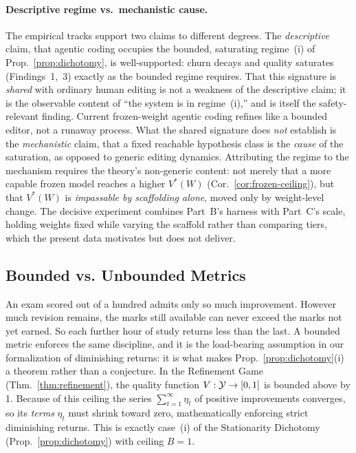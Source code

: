 \paragraph{Descriptive regime vs.\ mechanistic cause.} The empirical tracks support two claims to different degrees. The \emph{descriptive} claim, that agentic coding occupies the bounded, saturating regime~(i) of Prop.~\ref{prop:dichotomy}, is well-supported: churn decays and quality saturates (Findings~1,~3) exactly as the bounded regime requires. That this signature is \emph{shared} with ordinary human editing is not a weakness of the descriptive claim; it is the observable content of ``the system is in regime~(i),'' and is itself the safety-relevant finding. Current frozen-weight agentic coding refines like a bounded editor, not a runaway process. What the shared signature does \emph{not} establish is the \emph{mechanistic} claim, that a fixed reachable hypothesis class is the \emph{cause} of the saturation, as opposed to generic editing dynamics. Attributing the regime to the mechanism requires the theory's non-generic content: not merely that a more capable frozen model reaches a higher $V^*(W)$ (Cor.~\ref{cor:frozen-ceiling}), but that $V^*(W)$ is \emph{impassable by scaffolding alone}, moved only by weight-level change. The decisive experiment combines Part~B's harness with Part~C's scale, holding weights fixed while varying the scaffold rather than comparing tiers, which the present data motivates but does not deliver.

\subsection{Bounded vs. Unbounded Metrics}
\label{app:bounded-metrics}

An exam scored out of a hundred admits only so much improvement. However much revision remains, the marks still available can never exceed the marks not yet earned. So each further hour of study returns less than the last. A bounded metric enforces the same discipline, and it is the load-bearing assumption in our formalization of diminishing returns: it is what makes Prop.~\ref{prop:dichotomy}(i) a theorem rather than a conjecture. In the Refinement Game (Thm.~\ref{thm:refinement}), the quality function $V:\mathcal{Y}\to[0,1]$ is bounded above by 1. Because of this ceiling the series $\sum_{t=1}^{\infty}\eta_t$ of positive improvements converges, so its \emph{terms} $\eta_t$ must shrink toward zero, mathematically enforcing strict diminishing returns. This is exactly case~(i) of the Stationarity Dichotomy (Prop.~\ref{prop:dichotomy}) with ceiling $B=1$.

